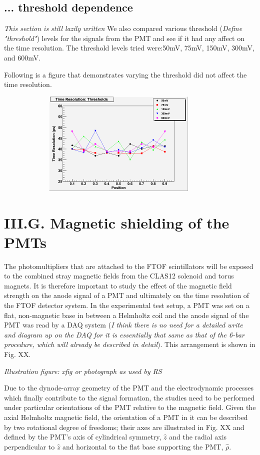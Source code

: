 \documentclass[12pt]{article}
\begin{document}
\subsection{... threshold dependence}
\textit{This section is still lazily written}
We also compared various threshold (\textit{Define "threshold"}) levels for the signals from the PMT and see if it had any affect on the time resolution. The threshold levels tried were:50mV, 75mV, 150mV, 300mV, and 600mV.

Following is a figure that demonstrates varying the threshold did not affect the time resolution.
\begin{figure}[th]
	\includegraphics[width=10cm, height=5cm]{ThresholdsTimeRes.pdf}
\end{figure}

\section{III.G. Magnetic shielding of the PMTs}
The photomultipliers that are attached to the FTOF scintillators will be exposed to the combined stray magnetic fields from the CLAS12 solenoid and torus magnets. It is therefore important to study the effect of the magnetic field strength on the anode signal of a PMT and ultimately on the time resolution of the FTOF detector system. In the experimental test setup, a PMT was set on a flat, non-magnetic base in between a Helmholtz coil and the anode signal of the PMT was read by a DAQ system (\textit{I think there is no need for a detailed write and diagram up on the DAQ for it is essentially that same as that of the 6-bar procedure, which will already be described in detail}). This arrangement is shown in Fig. XX.

\textit{Illustration figure: xfig or photograph as used by RS}

Due to the dynode-array geometry of the PMT and the electrodynamic processes which finally contribute to the signal formation, the studies need to be performed under particular orientations of the PMT relative to the magnetic field. Given the axial Helmholtz magnetic field, the orientation of a PMT in it can be described by two rotational degree of freedoms; their axes are illustrated in Fig. XX and defined by the PMT's axis of cylindrical symmetry, $\hat{z}$ and the radial axis perpendicular to $\hat{z}$ and horizontal to the flat base supporting the PMT, $\hat{\rho}$.
\end{document}
